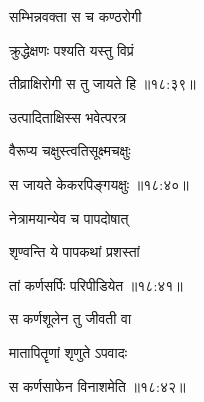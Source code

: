 \ujvers{}

\nemslokab

{\devanagarifontbold सम्भिन्नवक्ता स च कण्ठरोगी  \danda\dontdisplaylinenum }%
 
\nemslokac

{\devanagarifontbold क्रुद्धेक्षणः पश्यति यस्तु विप्रं }%
  \dontdisplaylinenum

\nemslokad

{\devanagarifontbold तीव्राक्षिरोगी स तु जायते हि {॥१८:३९॥} \veg\dontdisplaylinenum }%
 
\ujvers{}

\nemslokab

{\devanagarifontbold उत्पादिताक्षिस्स भवेत्परत्र  \danda\dontdisplaylinenum }%
 
\nemslokac

{\devanagarifontbold वैरूप्य चक्षुस्त्वतिसूक्ष्मचक्षुः }%
  \dontdisplaylinenum

\nemslokad

{\devanagarifontbold स जायते केकरपिङ्गयक्षुः {॥१८:४०॥} \veg\dontdisplaylinenum }%
 
\ujvers{}

\nemslokab

{\devanagarifontbold नेत्रामयान्येव च पापदोषात्  \danda\dontdisplaylinenum }%
 
\nemslokac

{\devanagarifontbold शृण्वन्ति ये पापकथां प्रशस्तां }%
  \dontdisplaylinenum

\nemslokad

{\devanagarifontbold तां कर्णसर्पिः परिपीडियेत {॥१८:४१॥} \veg\dontdisplaylinenum }%
 
\ujvers{}

\nemslokab

{\devanagarifontbold स कर्णशूलेन तु जीवती वा  \danda\dontdisplaylinenum }%
 
\nemslokac

{\devanagarifontbold मातापितॄणां शृणुते ऽपवादः }%
  \dontdisplaylinenum

\nemslokad

{\devanagarifontbold स कर्णसाफेन विनाशमेति {॥१८:४२॥} \veg\dontdisplaylinenum }%
 
